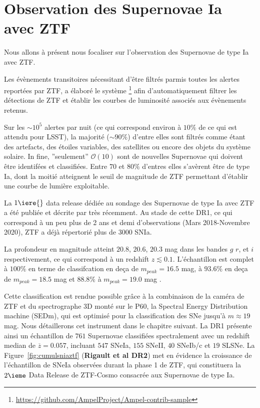 \documentclass[../main/main.tex]{subfiles}
\begin{document}
\section{Observation des Supernovae Ia avec ZTF}\label{sec:sniaztf}

Nous allons à présent nous focaliser sur l'observation des Supernovae de
type Ia avec ZTF.

Les évènements transitoires nécessitant d'être filtrés parmis toutes les
alertes reportées par ZTF, \citet{NordinAMPEL2019} a élaboré le système
\footnote{\url{https://github.com/AmpelProject/Ampel-contrib-sample}} afin d'automatiquement filtrer
les détections de ZTF et établir les courbes de luminosité associés aux
évènements retenus.

Sur les $\sim 10^{5}$ alertes par nuit (ce qui correspond environ à
$10\%$ de ce qui est attendu pour LSST), la majorité ($\sim 90\%$)
d'entre elles sont filtrés comme étant des artefacts, des étoiles
variables, des satellites ou encore des objets du système solaire. In
fine, ''seulement'' $\mathcal{O}(10)$ sont de nouvelles Supernovae qui
doivent être identifées et classifiées. Entre $70$ et $80\%$ d'entres
elles s'avèrent être de type Ia, dont la moitié atteignent le seuil de
magnitude de ZTF permettant d'établir une courbe de lumière
exploitable.

La $1\iere{}$ data release dédiée au sondage des Supernovae de type Ia
avec ZTF a été publiée et décrite par \citet{DhawanZTFDR1} très
récemment. Au stade de cette DR1, ce qui correspond à un peu plus de 2
ans et demi d'observations (Mars 2018-Novembre 2020), ZTF a déjà
répertorié plus de $3000$ SNIa.

La profondeur en magnitude atteint
$20.8$, $20.6$, $20.3$ mag dans les bandes $g$ $r$, et $i$ respectivement, ce qui
correspond à un redshift $z\lesssim0.1$. L'échantillon est complet à
$100\%$ en terme de classifcation en deça de $m_{peak}=16.5$ mag, à
$93.6\%$ en deça de $m_{peak}=18.5$ mag et $88.8\%$ à $m_{peak}=19.0$
mag \citep{FremlingZTFspec2020}.

Cette classification est rendue possible grâce à la combinaison de la
caméra de ZTF et du spectrographe 3D monté sur le P60, la Spectral
Energy Distribution machine (SEDm), qui est optimisé pour la
classification des SNe jusqu'à $m\approx19$ mag. Nous détaillerons cet instrument
dans le chapitre suivant. La DR1
présente ainsi un échantillon de $761$ Supernovae classifiées
spectralement avec un redshift median de $\overbar{z}=0.057$, incluant $547$ SNeIa, $155$ SNeII, $40$ SNeIb/c et $19$ SLSNe.
La Figure~\ref{fig:cumulsniaztf} (\textbf{Rigault et al DR2}) met en évidence la croissance de
l'échantillon de SNeIa observées durant la phase 1 de ZTF, qui
constituera la $2\ieme$ Data Release de ZTF-Cosmo consacrée aux Supernovae de
type Ia.
\end{document}
